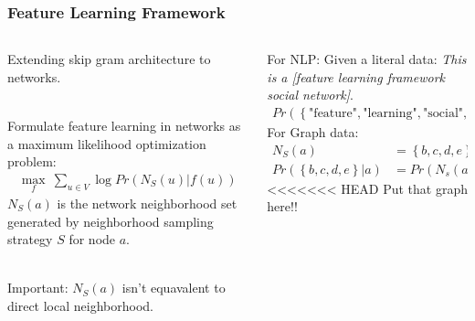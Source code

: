 \documentclass[notes, 10pt, aspectratio=169]{beamer}
\begin{document}
\begin{frame}
    \frametitle{Feature Learning Framework}
    \begin{columns}[t]
        \begin{column}{0.5\textwidth}
            Extending skip gram architecture to networks.\par ~\\
            Formulate feature learning in networks as a maximum likelihood optimization problem:
            \begin{align*}
                \max_{f}\ \sum_{u\in V}\log Pr\left( N_S\left( u \right)| f(u)  \right) 
            \end{align*}
            $N_S\left( a \right)$ is the network neighborhood set generated by neighborhood sampling strategy $S$ for node $a$.\par ~\\
            Important: $N_S\left( a \right)$ isn’t equavalent to direct local neighborhood.
        \end{column}
        \begin{column}{0.5\textwidth}
            For NLP: Given a literal data: \textit{This is a [feature learning \alert{framework} social network]}.
            \begin{align*}
                \scriptstyle
                Pr \left( \left\{ \text{"feature"}, \text{"learning"}, \text{"social"}, \text{"network"} \right\} | \text{"framework"} \right) 
            \end{align*}
            For Graph data: 
            \begin{align*}
                N_S\left( a \right) &= \left\{ b, c, d, e \right\} \\
            Pr\left( \left\{ b, c, d, e \right\}| a \right) &= Pr\left( N_s\left( a \right) | a \right) 
            \end{align*}
<<<<<<< HEAD
            Put that graph here!! 

\end{column}
\end{columns}
\end{frame}
\end{document}
